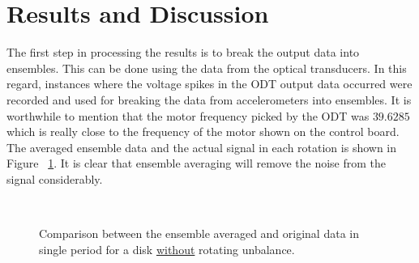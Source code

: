 \documentclass[paper=a4, fontsize=12pt]{scrartcl} %
\begin{document}
\section*{Results and Discussion}
The first step in processing the results is to break the output data into ensembles. This can be done using the data from the optical transducers. In this regard, instances where the voltage spikes in the ODT output data occurred were recorded and used for breaking the data from accelerometers into ensembles. It is worthwhile to mention that the motor frequency picked by the ODT was $39.6285$ which is really close to the frequency of the motor shown on the control board. The averaged ensemble data and the actual signal in each rotation is shown in Figure ~\ref{fig:result}. It is clear that ensemble averaging will remove the noise from the signal considerably.
%
\begin{figure}[H]
	\centering
	\\
	\caption{Comparison between the ensemble averaged and original data in single period for a disk \underline{without} rotating unbalance.}
	\label{fig:result}
\end{figure}
\end{document}
